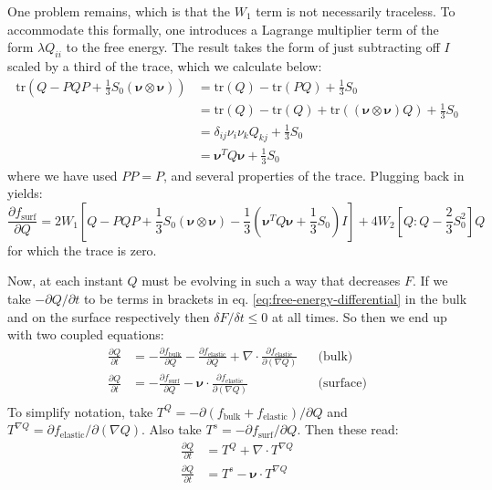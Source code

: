 \documentclass[reqno]{article}
\newcommand{\fb}{f_\text{bulk}}
\newcommand{\fe}{f_\text{elastic}}
\newcommand{\fs}{f_\text{surf}}
\newcommand{\tr}{\text{tr}}
\begin{document}
One problem remains, which is that the $W_1$ term is not necessarily traceless.
To accommodate this formally, one introduces a Lagrange multiplier term of the form $\lambda Q_{ii}$ to the free energy.
The result takes the form of just subtracting off $I$ scaled by a third of the trace, which we calculate below:
\begin{equation}
\begin{split}
    \tr \left(Q - PQP + \frac13 S_0 \left(\boldsymbol\nu \otimes \boldsymbol\nu\right) \right)
    &=
    \tr(Q) - \tr (PQ) + \frac13 S_0 \\
    &=
    \tr(Q) - \tr(Q) + \tr\left(\left(\boldsymbol\nu \otimes \boldsymbol\nu\right) Q \right) + \frac13 S_0 \\
    &=
    \delta_{ij} \nu_i \nu_k Q_{kj} + \frac13 S_0 \\
    &= \boldsymbol\nu^T Q \boldsymbol\nu + \frac13 S_0
\end{split}
\end{equation}
where we have used $PP = P$, and several properties of the trace.
Plugging back in yields:
\begin{equation}
    \frac{\partial \fs}{\partial Q}
    =
    2 W_1 \left[ 
        Q - PQP + \frac13 S_0 \left( \boldsymbol\nu \otimes \boldsymbol\nu \right)
        - \frac13 \left(\boldsymbol\nu^T Q \boldsymbol\nu + \frac13 S_0\right) I
    \right]
    + 4 W_2 \left[ Q : Q - \frac23 S_0^2 \right] Q
\end{equation}
for which the trace is zero.

Now, at each instant $Q$ must be evolving in such a way that decreases $F$. 
If we take $-\partial Q / \partial t$ to be terms in brackets in eq. \eqref{eq:free-energy-differential} in the bulk and on the surface respectively then $\delta F / \delta t \leq 0$ at all times.
So then we end up with two coupled equations:
\begin{align}
    \frac{\partial Q}{\partial t}
    &=
    -\frac{\partial \fb}{\partial Q}
    - \frac{\partial \fe}{\partial Q}
    + \nabla \cdot \frac{\partial \fe}{\partial \left(\nabla Q\right)} &&\text{(bulk)} \\
    \frac{\partial Q}{\partial t}
    &=
    -\frac{\partial \fs}{\partial Q}
    - \boldsymbol\nu \cdot \frac{\partial \fe}{\partial \left(\nabla Q\right)} &&\text{(surface)} \\
\end{align}
To simplify notation, take $T^Q = -\partial (\fb + \fe) / \partial Q$ and $T^{\nabla Q} = \partial \fe / \partial (\nabla Q)$.
Also take $T^s = -\partial \fs / \partial Q$.
Then these read:
\begin{align}
    \frac{\partial Q}{\partial t} \label{eq:Q-bulk-evolution}
    &=
    T^Q
    + \nabla \cdot T^{\nabla Q} \\
    \frac{\partial Q}{\partial t} \label{eq:Q-surf-evolution}
    &=
    T^s
    - \boldsymbol\nu \cdot T^{\nabla Q}
\end{align}
\end{document}
